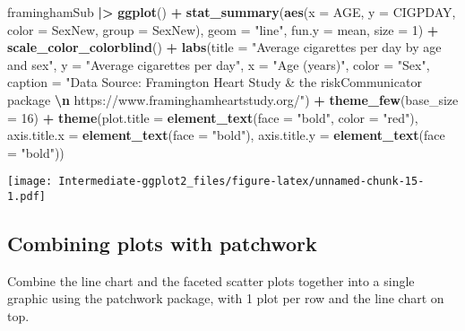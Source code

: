 \documentclass[
]{article}
\newenvironment{Shaded}{\begin{snugshade}}{\end{snugshade}}
\newcommand{\AttributeTok}[1]{\textcolor[rgb]{0.13,0.29,0.53}{#1}}
\newcommand{\DecValTok}[1]{\textcolor[rgb]{0.00,0.00,0.81}{#1}}
\newcommand{\FunctionTok}[1]{\textcolor[rgb]{0.13,0.29,0.53}{\textbf{#1}}}
\newcommand{\NormalTok}[1]{#1}
\newcommand{\SpecialCharTok}[1]{\textcolor[rgb]{0.81,0.36,0.00}{\textbf{#1}}}
\newcommand{\StringTok}[1]{\textcolor[rgb]{0.31,0.60,0.02}{#1}}
\begin{document}
\begin{Shaded}
\begin{Highlighting}[]
\NormalTok{framinghamSub }\SpecialCharTok{|\textgreater{}}
  \FunctionTok{ggplot}\NormalTok{() }\SpecialCharTok{+}
  \FunctionTok{stat\_summary}\NormalTok{(}\FunctionTok{aes}\NormalTok{(}\AttributeTok{x =}\NormalTok{ AGE,}
                   \AttributeTok{y =}\NormalTok{ CIGPDAY,}
                   \AttributeTok{color =}\NormalTok{ SexNew,}
                   \AttributeTok{group =}\NormalTok{ SexNew),}
               \AttributeTok{geom =} \StringTok{"line"}\NormalTok{,}
               \AttributeTok{fun.y =}\NormalTok{ mean,}
               \AttributeTok{size =} \DecValTok{1}\NormalTok{) }\SpecialCharTok{+}
  \FunctionTok{scale\_color\_colorblind}\NormalTok{() }\SpecialCharTok{+}
  \FunctionTok{labs}\NormalTok{(}\AttributeTok{title =} \StringTok{"Average cigarettes per day by age and sex"}\NormalTok{,}
       \AttributeTok{y =} \StringTok{"Average cigarettes per day"}\NormalTok{,}
       \AttributeTok{x =} \StringTok{"Age (years)"}\NormalTok{,}
       \AttributeTok{color =} \StringTok{"Sex"}\NormalTok{,}
       \AttributeTok{caption =} \StringTok{"Data Source: Framington Heart Study \& the riskCommunicator package }\SpecialCharTok{\textbackslash{}n}\StringTok{ https://www.framinghamheartstudy.org/"}\NormalTok{) }\SpecialCharTok{+}
  \FunctionTok{theme\_few}\NormalTok{(}\AttributeTok{base\_size =} \DecValTok{16}\NormalTok{) }\SpecialCharTok{+}
  \FunctionTok{theme}\NormalTok{(}\AttributeTok{plot.title =} \FunctionTok{element\_text}\NormalTok{(}\AttributeTok{face =} \StringTok{"bold"}\NormalTok{, }\AttributeTok{color =} \StringTok{"red"}\NormalTok{),}
        \AttributeTok{axis.title.x =} \FunctionTok{element\_text}\NormalTok{(}\AttributeTok{face =} \StringTok{"bold"}\NormalTok{),}
        \AttributeTok{axis.title.y =} \FunctionTok{element\_text}\NormalTok{(}\AttributeTok{face =} \StringTok{"bold"}\NormalTok{))}
\end{Highlighting}
\end{Shaded}

\texttt{[image: Intermediate-ggplot2\_files/figure-latex/unnamed-chunk-15-1.pdf]}

\hypertarget{combining-plots-with-patchwork}{%
\subsection{Combining plots with
patchwork}\label{combining-plots-with-patchwork}}

Combine the line chart and the faceted scatter plots together into a
single graphic using the patchwork package, with 1 plot per row and the
line chart on top.
\end{document}
